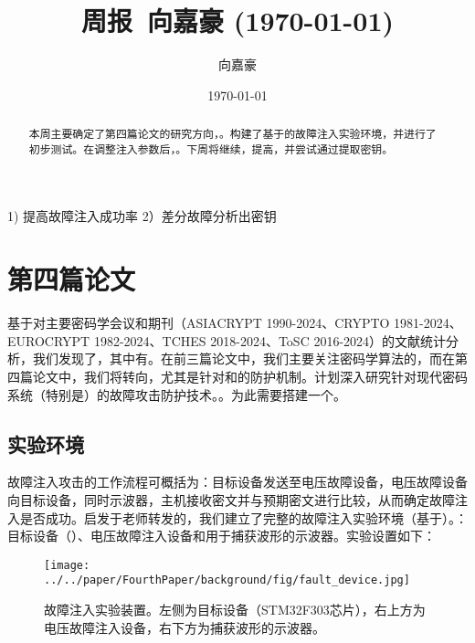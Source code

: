 \documentclass{article}
\title{周报~向嘉豪 (\today)}
\author{向嘉豪}
\date{\today}
\begin{document}
\maketitle

\begin{abstract}
  本周主要确定了第四篇论文的研究方向，。构建了基于的故障注入实验环境，并进行了初步测试。在调整注入参数后，。下周将继续，提高，并尝试通过提取密钥。
\end{abstract}

\begin{weekplan}
1) 提高故障注入成功率 2）差分故障分析出密钥
\end{weekplan}

\section{第四篇论文}


基于对主要密码学会议和期刊（ASIACRYPT 1990-2024、CRYPTO 1981-2024、EUROCRYPT 1982-2024、TCHES 2018-2024、ToSC 2016-2024）的文献统计分析，我们发现了，其中有。在前三篇论文中，我们主要关注密码学算法的，而在第四篇论文中，我们将转向，尤其是针对和的防护机制。计划深入研究针对现代密码系统（特别是）的故障攻击防护技术。。为此需要搭建一个。

\subsection{实验环境}

故障注入攻击的工作流程可概括为：目标设备发送至电压故障设备，电压故障设备向目标设备，同时示波器，主机接收密文并与预期密文进行比较，从而确定故障注入是否成功。启发于老师转发的，我们建立了完整的故障注入实验环境（基于）。：目标设备（）、电压故障注入设备和用于捕获波形的示波器。实验设置如下：

\begin{figure}[htbp]
    \centering
    \texttt{[image: ../../paper/FourthPaper/background/fig/fault\_device.jpg]}
    \caption{故障注入实验装置。左侧为目标设备（STM32F303芯片），右上方为电压故障注入设备，右下方为捕获波形的示波器。}
    \label{fig:fault_device}
\end{figure}
\end{document}
